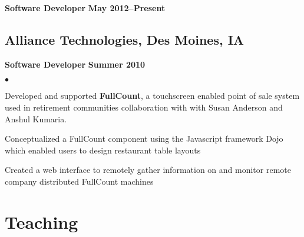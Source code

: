 \documentclass[10pt,letterpaper]{article}
\renewenvironment{itemize}{
  \begin{list}{}{
      \setlength{\leftmargin}{1.5em}
      \setlength{\itemsep}{0.25em}
      \setlength{\parskip}{0pt}
      \setlength{\parsep}{0.25em}
    }
  }{
  \end{list}
}
\newenvironment{bitemize}{
  \begin{list}{\(\bullet \)}{
      \setlength{\leftmargin}{1.5em}
      \setlength{\itemsep}{0.25em}
      \setlength{\parskip}{0pt}
      \setlength{\parsep}{0.25em}
    }
  }{
  \end{list}
}
\newcommand{\yearrange}[1]{\hfill \textbf{#1} \par}
\begin{document}
\begin{itemize}
  \item \textbf{Software Developer} \yearrange{May 2012--Present}
\end{itemize}

\subsection*{Alliance Technologies, Des Moines, IA}

\begin{itemize}
  \item \textbf{Software Developer} \yearrange{Summer 2010}
    \begin{bitemize}
    \item Developed and supported \textbf{FullCount}, a touchscreen
      enabled point of sale system used in retirement communities %
      collaboration with with Susan Anderson and Anshul Kumaria.
    \item Conceptualized a FullCount component using the Javascript
      framework Dojo which enabled users to design restaurant table
      layouts
  \item Created a web interface to remotely gather information on and
    monitor remote company distributed FullCount machines
  \end{bitemize}
\end{itemize}


\section*{Teaching}
\end{document}
